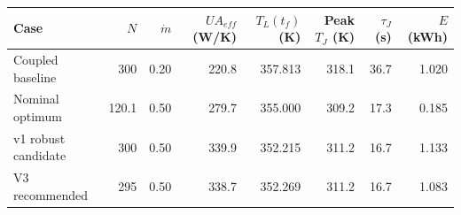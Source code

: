 \begin{tabular}{lrrrrrrr}
\toprule
Case & $N$ & $\dot m$ & $UA_{eff}$ (W/K) & $T_L(t_f)$ (K) & Peak $T_J$ (K) & $\tau_J$ (s) & $E$ (kWh) \\
\midrule
Coupled baseline & 300 & 0.20 & 220.8 & 357.813 & 318.1 & 36.7 & 1.020 \\
Nominal optimum & 120.1 & 0.50 & 279.7 & 355.000 & 309.2 & 17.3 & 0.185 \\
v1 robust candidate & 300 & 0.50 & 339.9 & 352.215 & 311.2 & 16.7 & 1.133 \\
V3 recommended & 295 & 0.50 & 338.7 & 352.269 & 311.2 & 16.7 & 1.083 \\
\bottomrule
\end{tabular}
